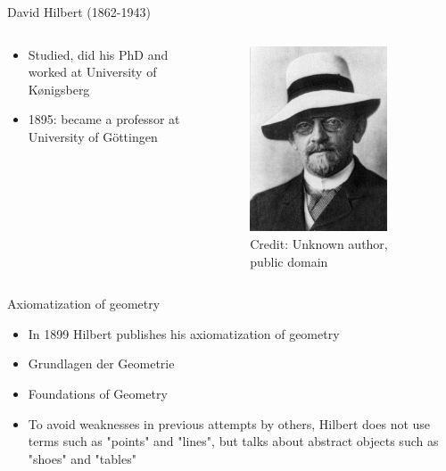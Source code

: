 \documentclass[utf8]{beamer}
\begin{document}
\begin{frame}{David Hilbert (1862-1943)}
\begin{columns}
\begin{column}{0.6\textwidth}
\begin{itemize}
\item Studied, did his PhD and worked at University of K{\o}nigsberg
\item 1895: became a professor at University of G{\"o}ttingen
\end{itemize}
\end{column}
\begin{column}{0.4\textwidth}
\begin{figure}
\centering
\includegraphics[width=0.8\textwidth]{images/hilbert.jpg}
\\
\tiny Credit: Unknown author, public domain
\end{figure}
\end{column}
\end{columns}
\end{frame}

\begin{frame}{Axiomatization of geometry}
\begin{itemize}
\item In 1899 Hilbert publishes his axiomatization of geometry
\item Grundlagen der Geometrie
\item Foundations of Geometry
\item To avoid weaknesses in previous attempts by others, Hilbert does not use terms such as "points" and "lines", but
talks about abstract objects such as "shoes" and "tables"
\end{itemize}
\end{frame}
\end{document}
